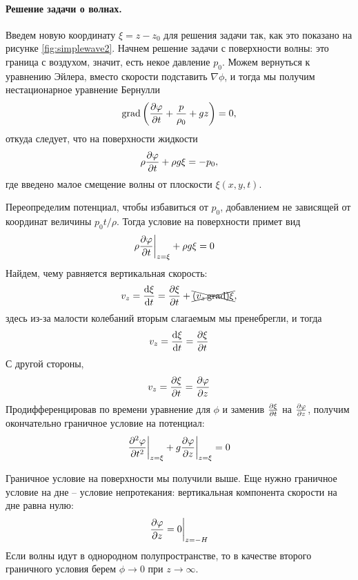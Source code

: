 \paragraph{Решение задачи о волнах.} Введем новую координату $\xi=z-z_0$  для решения задачи так, как это показано на рисунке \ref{fig:simplewave2}. Начнем решение задачи с поверхности волны: это граница с воздухом, значит, есть некое давление $p_0$. Можем вернуться к уравнению Эйлера, вместо скорости подставить $\nabla\phi$, и тогда мы получим нестационарное уравнение Бернулли
\begin{equation}
	\operatorname{grad}\qty(\pdv{\varphi}{t}+\frac{p}{\rho_0}+gz)=0,
\end{equation}
откуда следует, что на поверхности жидкости
\begin{equation}
	\rho\pdv{\varphi}{t}+\rho g\xi=-p_0,
\end{equation}
где введено малое смещение волны от плоскости $\xi(x,y,t)$.

Переопределим потенциал, чтобы избавиться от $p_0$, добавлением не зависящей от координат величины $p_0t/\rho$. Тогда условие на поверхности примет вид
\begin{equation}
	\rho\pdv{\varphi}{t}\bigg|_{z=\xi}+\rho g\xi=0 \quad 
\end{equation}
Найдем, чему равняется вертикальная скорость:
\begin{equation}
	v_z=\dv{\xi}{t}=\pdv{\xi}{t}+\xcancel{(v_z\operatorname{grad})\xi},
\end{equation}
здесь из-за малости колебаний вторым слагаемым мы пренебрегли,  и тогда
\begin{equation}
	v_z=\dv{\xi}{t}=\pdv{\xi}{t}
\end{equation}
С другой стороны, 
\begin{equation}
	v_z=\pdv{\xi}{t}=\pdv{\varphi}{z}
\end{equation}
Продифференцировав по времени уравнение для $\phi$ и заменив $\pdv{\xi}{t}$ на $\pdv{\varphi}{z}$, получим окончательно граничное условие  на потенциал:
\begin{equation}
	\pdv[2]{\varphi}{t}\bigg|_{z=\xi}+g\pdv{\varphi}{z}\bigg|_{z=\xi}=0
\end{equation}

Граничное условие на поверхности мы получили выше. Еще нужно граничное условие на дне -- условие непротекания: вертикальная компонента скорости на дне равна нулю:
\begin{equation}
	\pdv{\varphi}{z}=0 \bigg|_{z=-H}
\end{equation}
Если волны идут в однородном полупространстве, то в качестве второго
граничного условия берем $\phi \to 0$ при $z\to\infty$.

